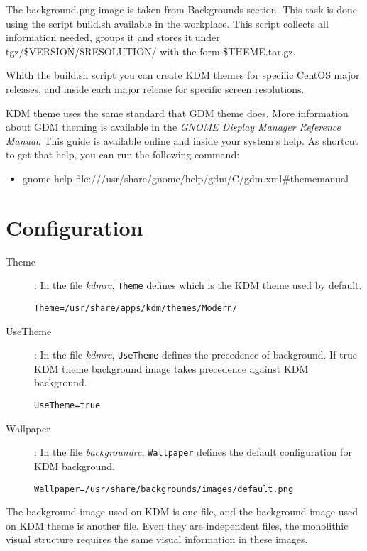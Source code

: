 \documentclass{article}
\begin{document}
The background.png image is taken from Backgrounds section. This task
is done using the script build.sh available in the workplace. This
script collects all information needed, groups it and stores it under
tgz/\$VERSION/\$RESOLUTION/ with the form \$THEME.tar.gz.

Whith the build.sh script you can create KDM themes for specific
CentOS major releases, and inside each major release for specific
screen resolutions.

KDM theme uses the same standard that GDM theme does. More information
about GDM theming is available in the \textit{GNOME Display Manager
Reference Manual}. This guide is available online and inside your
system's help. As shortcut to get that help, you can run the following
command:

\begin{itemize}
\item gnome-help file:///usr/share/gnome/help/gdm/C/gdm.xml\#thememanual
\end{itemize}

\section{Configuration}



\begin{description}

\item[Theme]: In the file \emph{kdmrc}, \texttt{Theme} defines which
is the KDM theme used by default.

\texttt{Theme=/usr/share/apps/kdm/themes/Modern/}

\item[UseTheme]: In the file \emph{kdmrc}, \texttt{UseTheme} defines
the precedence of background. If true KDM theme background image takes
precedence against KDM background.

\texttt{UseTheme=true}

\item[Wallpaper]: In the file \emph{backgroundrc}, \texttt{Wallpaper}
defines the default configuration for KDM background.

\texttt{Wallpaper=/usr/share/backgrounds/images/default.png}

\end{description}

The background image used on KDM is one file, and the background image
used on KDM theme is another file. Even they are independent files,
the monolithic visual structure requires the same visual information
in these images.
\end{document}
